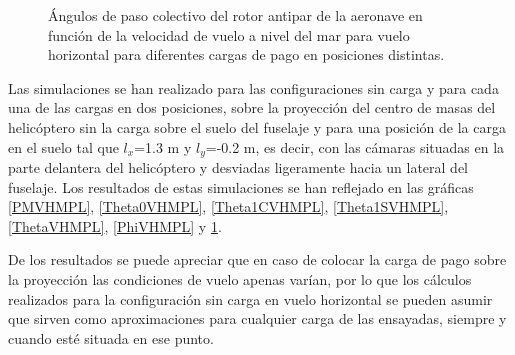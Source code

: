 \begin{figure}
	\centering
	\caption{Ángulos de paso colectivo del rotor antipar de la aeronave en función de la velocidad de vuelo a nivel del mar para vuelo horizontal para diferentes cargas de pago en posiciones distintas.}
	\label{Theta0VHraMPL}
\end{figure}

Las simulaciones se han realizado para las configuraciones sin carga y para cada una de las cargas en dos posiciones, sobre la proyección del centro de masas del helicóptero sin la carga sobre el suelo del fuselaje y para una posición de la carga en el suelo tal que $l_x$=1.3 m y $l_y$=-0.2 m, es decir, con las cámaras situadas en la parte delantera del helicóptero y desviadas ligeramente hacia un lateral del fuselaje. Los resultados de estas simulaciones se han reflejado en las gráficas \ref{PMVHMPL}, \ref{Theta0VHMPL}, \ref{Theta1CVHMPL}, \ref{Theta1SVHMPL}, \ref{ThetaVHMPL}, \ref{PhiVHMPL} y \ref{Theta0VHraMPL}.

De los resultados se puede apreciar que en caso de colocar la carga de pago sobre la proyección las condiciones de vuelo apenas varían, por lo que los cálculos realizados para la configuración sin carga en vuelo horizontal se pueden asumir que sirven como aproximaciones para cualquier carga de las ensayadas, siempre y cuando esté situada en ese punto.

